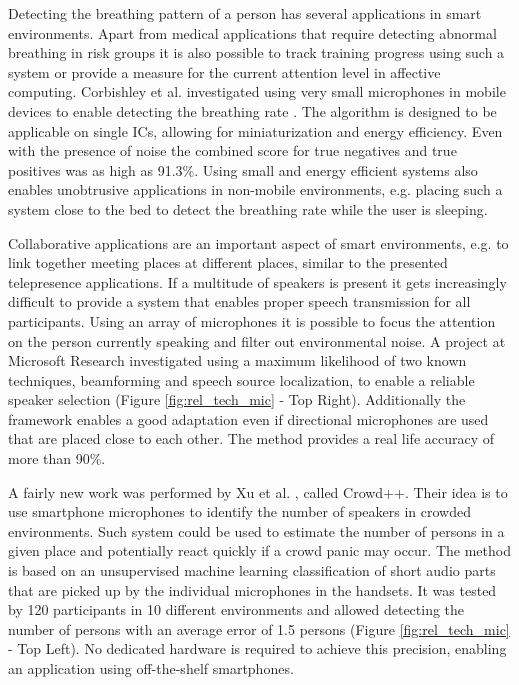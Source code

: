 Detecting the breathing pattern of a person has several applications in smart environments. Apart from medical applications that require detecting abnormal breathing in risk groups it is also possible to track training progress using such a system or provide a measure for the current attention level in affective computing. Corbishley et al. investigated using very small microphones in mobile devices to enable detecting the breathing rate \cite{corbishley2008breathing}. The algorithm is designed to be applicable on single ICs, allowing for miniaturization and energy efficiency. Even with the presence of noise the combined score for true negatives and true positives was as high as 91.3\%. Using small and energy efficient systems also enables unobtrusive applications in non-mobile environments, e.g. placing such a system close to the bed to detect the breathing rate while the user is sleeping.

Collaborative applications are an important aspect of smart environments, e.g. to link together meeting places at different places, similar to the presented telepresence applications. If a multitude of speakers is present it gets increasingly difficult to provide a system that enables proper speech transmission for all participants. Using an array of microphones it is possible to focus the attention on the person currently speaking and filter out environmental noise. A project at Microsoft Research investigated using a maximum likelihood of two known techniques, beamforming and speech source localization, to enable a reliable speaker selection \cite{zhang2008maximum} (Figure \ref{fig:rel_tech_mic} - Top Right). Additionally the framework enables a good adaptation even if directional microphones are used that are placed close to each other. The method provides a real life accuracy of more than 90\%.

A fairly new work was performed by Xu et al. \cite{xu2013crowd++}, called Crowd++. Their idea is to use smartphone microphones to identify the number of speakers in crowded environments. Such system could be used to estimate the number of persons in a given place and potentially react quickly if a crowd panic may occur. The method is based on an unsupervised machine learning classification of short audio parts that are picked up by the individual microphones in the handsets. It was tested by 120 participants in 10 different environments and allowed detecting the number of persons with an average error of 1.5 persons (Figure \ref{fig:rel_tech_mic} - Top Left). No dedicated hardware is required to achieve this precision, enabling an application using off-the-shelf smartphones.

